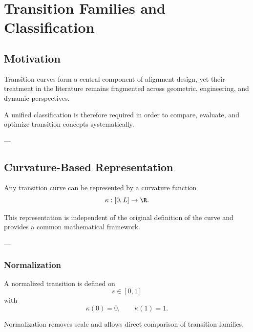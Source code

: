 \chapter{Transition Families and Classification}

\section{Motivation}

\begin{remark}
Transition curves form a central component of alignment design, yet
their treatment in the literature remains fragmented across geometric,
engineering, and dynamic perspectives.
\end{remark}

\begin{remark}
A unified classification is therefore required in order to compare,
evaluate, and optimize transition concepts systematically.
\end{remark}

---

\section{Curvature-Based Representation}

\begin{proposition}
Any transition curve can be represented by a curvature function
\[
\kappa : [0,L] \to \R.
\]
\end{proposition}

\begin{remark}
This representation is independent of the original definition of the
curve and provides a common mathematical framework.
\end{remark}

---

\subsection{Normalization}

\begin{definition}
A normalized transition is defined on
\[
s \in [0,1]
\]
with
\[
\kappa(0)=0, \qquad \kappa(1)=1.
\]
\end{definition}

\begin{remark}
Normalization removes scale and allows direct comparison of transition
families.
\end{remark}

